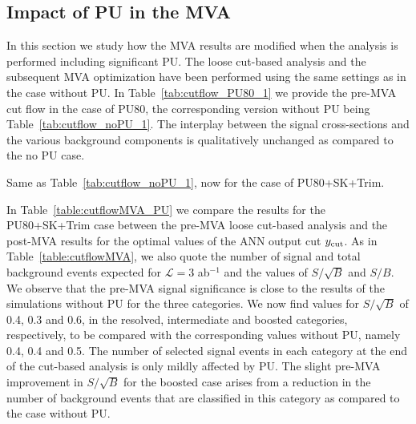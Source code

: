 \subsection{Impact of PU in the MVA}

In this section we study how the MVA results are modified
when the analysis is performed including significant PU.
%
The loose cut-based analysis and the subsequent
MVA optimization have been performed using the same
settings as in the case without PU.
%
In Table~\ref{tab:cutflow_PU80_1}
we provide the pre-MVA cut flow in the case of PU80,
the corresponding version without PU being
Table~\ref{tab:cutflow_noPU_1}.
%
The interplay between the signal cross-sections and the various
background components is qualitatively unchanged as compared
to the no PU case.

\begin{table}[t]
  \centering
  \scriptsize
      
    \caption{\small Same as Table~\ref{tab:cutflow_noPU_1},
now for the case
    of PU80+SK+Trim.
 \label{tab:cutflow_PU80_1}}
\end{table}

In Table~\ref{table:cutflowMVA_PU} we compare the results
for the PU80+SK+Trim case between
  the pre-MVA loose cut-based analysis and
  the post-MVA results for the
  optimal values of the ANN output cut $y_{\rm cut}$.
  As in Table~\ref{table:cutflowMVA}, 
  we also quote 
   the number of signal and
    total background events expected
   for $\mathcal{L}=3$ ab$^{-1}$
    and the values of $S/\sqrt{B}$ and $S/B$.
%
We observe that the pre-MVA 
signal significance is close
to the results of the simulations
without PU for the three categories.
%
We now find values for $S/\sqrt{B}$ of 0.4, 0.3 and 0.6, in the resolved,
intermediate and boosted categories, respectively, to be compared
with the corresponding values without PU, namely 0.4, 0.4 and 0.5.
%
The number of selected
signal events in each category at the
end of the cut-based analysis is only mildly affected
by PU.
%
The slight pre-MVA improvement in $S/\sqrt{B}$ for the
boosted case arises from a reduction in the number
of background events that are classified in this category
as compared to the case without PU.

